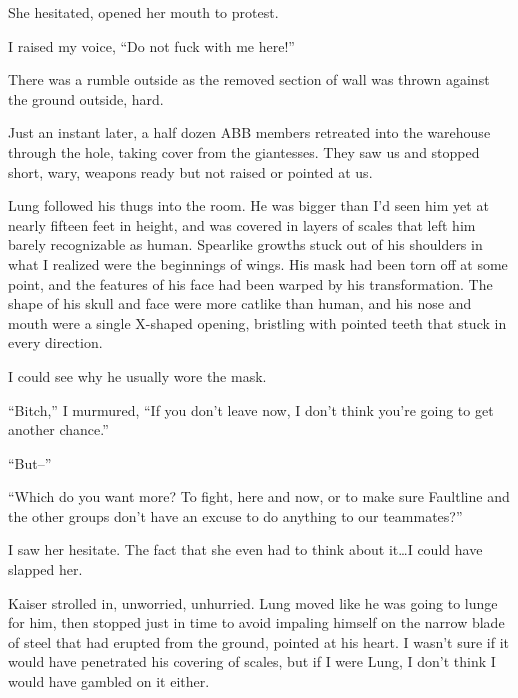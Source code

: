 She hesitated, opened her mouth to protest.



I raised my voice, ``Do not fuck with me here!''



There was a rumble outside as the removed section of wall was thrown against the ground outside, hard.



Just an instant later, a half dozen ABB members retreated into the warehouse through the hole, taking cover from the giantesses.  They saw us and stopped short, wary, weapons ready but not raised or pointed at us.



Lung followed his thugs into the room.  He was bigger than I'd seen him yet at nearly fifteen feet in height, and was covered in layers of scales that left him barely recognizable as human.  Spearlike growths stuck out of his shoulders in what I realized were the beginnings of wings.  His mask had been torn off at some point, and the features of his face had been warped by his transformation.  The shape of his skull and face were more catlike than human, and his nose and mouth were a single X-shaped opening, bristling with pointed teeth that stuck in every direction.



I could see why he usually wore the mask.



``Bitch,'' I murmured, ``If you don't leave now, I don't think you're going to get another chance.''



``But--''



``Which do you want more?  To fight, here and now, or to make sure Faultline and the other groups don't have an excuse to do anything to our teammates?''



I saw her hesitate.  The fact that she even had to think about it\ldots I could have slapped her.



Kaiser strolled in, unworried, unhurried.  Lung moved like he was going to lunge for him, then stopped just in time to avoid impaling himself on the narrow blade of steel that had erupted from the ground, pointed at his heart.  I wasn't sure if it would have penetrated his covering of scales, but if I were Lung, I don't think I would have gambled on it either.



